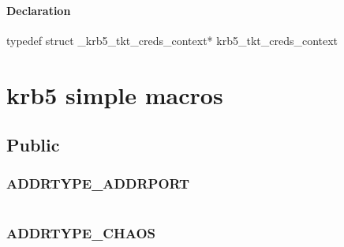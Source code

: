 \documentclass[letterpaper,10pt,english]{sphinxmanual}
\begin{document}
\begin{fulllineitems}
\label{appdev/refs/types/krb5_tkt_creds_context:c.krb5_tkt_creds_context}
\end{fulllineitems}



\paragraph{Declaration}
\label{appdev/refs/types/krb5_tkt_creds_context:declaration}
typedef struct \_krb5\_tkt\_creds\_context* krb5\_tkt\_creds\_context


\section{krb5 simple macros}
\label{appdev/refs/macros/index:krb5-simple-macros}\label{appdev/refs/macros/index::doc}

\subsection{Public}
\label{appdev/refs/macros/index:public}

\subsubsection{ADDRTYPE\_ADDRPORT}
\label{appdev/refs/macros/ADDRTYPE_ADDRPORT:addrtype-addrport-data}\label{appdev/refs/macros/ADDRTYPE_ADDRPORT::doc}\label{appdev/refs/macros/ADDRTYPE_ADDRPORT:addrtype-addrport}

\begin{fulllineitems}
\label{appdev/refs/macros/ADDRTYPE_ADDRPORT:ADDRTYPE_ADDRPORT}
\end{fulllineitems}


\begin{tabulary}{\linewidth}{|L|L|}
\hline

 & 
\\
\hline\end{tabulary}



\subsubsection{ADDRTYPE\_CHAOS}
\label{appdev/refs/macros/ADDRTYPE_CHAOS:addrtype-chaos}\label{appdev/refs/macros/ADDRTYPE_CHAOS:addrtype-chaos-data}\label{appdev/refs/macros/ADDRTYPE_CHAOS::doc}
\end{document}

